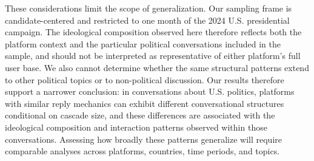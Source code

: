 \documentclass[letterpaper]{article} %
\newcommand{\cb}[1]{\textcolor{blue}{CB: #1}}
\newcommand{\rev}[1]{{\color{blue}#1}}
\begin{document}
\rev{These considerations limit the scope of generalization. Our sampling frame is candidate-centered and restricted to one month of the 2024 U.S. presidential campaign. The ideological composition observed here therefore reflects both the platform context and the particular political conversations included in the sample, and should not be interpreted as representative of either platform's full user base. We also cannot determine whether the same structural patterns extend to other political topics or to non-political discussion. Our results therefore support a narrower conclusion: in conversations about U.S. politics, platforms with similar reply mechanics can exhibit different conversational structures conditional on cascade size, and these differences are associated with the ideological composition and interaction patterns observed within those conversations. Assessing how broadly these patterns generalize will require comparable analyses across platforms, countries, time periods, and topics.
}





\end{document}
